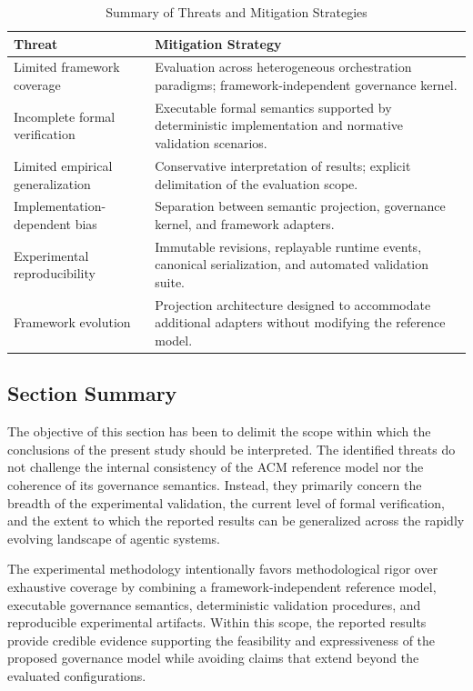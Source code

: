 \documentclass[10pt]{article}
\begin{document}
\begin{table}[t]
\caption{Summary of Threats and Mitigation Strategies}
\label{tab:mitigation_strategies}
\centering
\begin{tabular}{p{4.2cm}p{3.9cm}}
\toprule
\textbf{Threat} & \textbf{Mitigation Strategy} \\
\midrule
Limited framework coverage &
Evaluation across heterogeneous orchestration paradigms; framework-independent governance kernel. \\

Incomplete formal verification &
Executable formal semantics supported by deterministic implementation and normative validation scenarios. \\

Limited empirical generalization &
Conservative interpretation of results; explicit delimitation of the evaluation scope. \\

Implementation-dependent bias &
Separation between semantic projection, governance kernel, and framework adapters. \\

Experimental reproducibility &
Immutable revisions, replayable runtime events, canonical serialization, and automated validation suite. \\

Framework evolution &
Projection architecture designed to accommodate additional adapters without modifying the reference model. \\
\bottomrule
\end{tabular}
\end{table}

\subsection{Section Summary}
\label{sec:threats_summary}

The objective of this section has been to delimit the scope within which the conclusions of the present study should be interpreted. The identified threats do not challenge the internal consistency of the ACM reference model nor the coherence of its governance semantics. Instead, they primarily concern the breadth of the experimental validation, the current level of formal verification, and the extent to which the reported results can be generalized across the rapidly evolving landscape of agentic systems.

The experimental methodology intentionally favors methodological rigor over exhaustive coverage by combining a framework-independent reference model, executable governance semantics, deterministic validation procedures, and reproducible experimental artifacts. Within this scope, the reported results provide credible evidence supporting the feasibility and expressiveness of the proposed governance model while avoiding claims that extend beyond the evaluated configurations.
\end{document}
